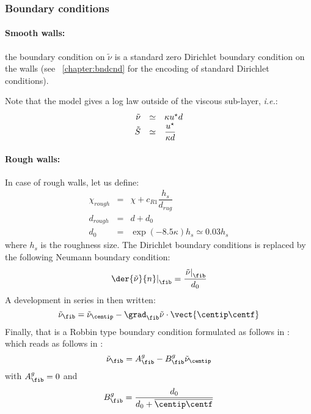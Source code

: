 \subsubsection{Boundary conditions}

\paragraph{Smooth walls:}
the boundary condition on $\tilde{\nu}$ is a standard zero Dirichlet boundary condition on the walls 
(see \chaptername~\ref{chapter:bndcnd} for the encoding of standard Dirichlet conditions).

Note that the model gives a log law outside of the viscous sub-layer, \emph{i.e.}:
\begin{equation}
\begin{array}{r c l}
\tilde{\nu} & \simeq & \kappa u^\star d \\
\tilde{S} & \simeq & \dfrac{u^\star}{ \kappa d} 
\end{array}
\end{equation}

\paragraph{Rough walls:}
In case of rough walls, let us define:
\begin{equation}
\begin{array}{rcl}
\chi_{rough} & = & \chi + c_{R1} \dfrac{h_s}{d_{rug}} \\
d_{rough} & = & d + d_0 \\
d_0     & = & \exp \left( -8.5 \kappa \right) h_s \simeq 0.03 h_s
\end{array}
\end{equation}
%
where $h_s$ is the roughness size. The Dirichlet boundary conditions 
is replaced by the following Neumann boundary condition:
%
\begin{equation}\label{eq:eq_neumann_nu}
\left. \der{\tilde{ \nu}}{n} \right|_\fib = \dfrac{\left. \tilde{ \nu}\right|_\fib }{ d_0}
\end{equation}
%
A development in series in then written:
\begin{equation}\label{eq:eq_neumann_nu_vf}
 \tilde{\nu}_\fib = \tilde{\nu}_{\centip} -   \grad_\fib \tilde{ \nu} \cdot \vect{\centip \centf} 
\end{equation}
Finally, that is a Robbin type boundary condition formulated as follows in \CS:
which reads as follows in \CS:
\begin{equation}\label{eq:eq_neumann_nu_coef}
 \tilde{\nu}_\fib = A^g_\fib - B^g_\fib \tilde{\nu}_\centip
\end{equation}
with $A^g_\fib=0$ and
%
\begin{equation}\label{eq:eq_neumann_nu_coefb}
 B^g_\fib = \dfrac{d_0}{d_0 + \overline{\centip \centf} } 
\end{equation}

